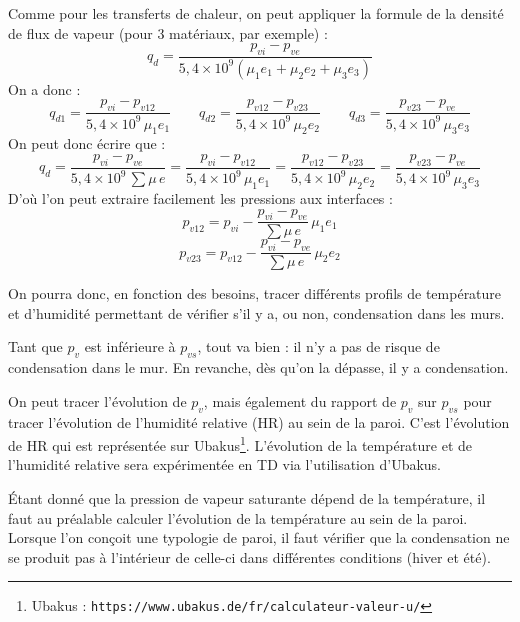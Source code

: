 Comme pour les transferts de chaleur, on peut appliquer la formule de la densité de flux de vapeur (pour 3 matériaux, par exemple) :
\begin{equation}
  q_d = \frac{p_{vi} - p_{ve}}{5{,}4\times10^{9}\left(\mu_1 e_1 + \mu_2 e_2 + \mu_3 e_3\right)}
\end{equation}
On a donc :
\begin{equation}
  q_{d1} = \frac{p_{vi} - p_{v12}}{5{,}4\times10^{9}\,\mu_1 e_1} \qquad
  q_{d2} = \frac{p_{v12} - p_{v23}}{5{,}4\times10^{9}\,\mu_2 e_2} \qquad
  q_{d3} = \frac{p_{v23} - p_{ve}}{5{,}4\times10^{9}\,\mu_3 e_3}
\end{equation}
On peut donc écrire que :
\begin{equation}
  q_d = \frac{p_{vi} - p_{ve}}{5{,}4\times10^{9}\,\sum \mu\,e}
      = \frac{p_{vi} - p_{v12}}{5{,}4\times10^{9}\,\mu_1 e_1}
      = \frac{p_{v12} - p_{v23}}{5{,}4\times10^{9}\,\mu_2 e_2}
      = \frac{p_{v23} - p_{ve}}{5{,}4\times10^{9}\,\mu_3 e_3}
\end{equation}
D'où l'on peut extraire facilement les pressions aux interfaces :
\begin{equation}
  p_{v12} = p_{vi} - \frac{p_{vi} - p_{ve}}{\sum \mu\,e}\,\mu_1 e_1
\end{equation}
\begin{equation}
  p_{v23} = p_{v12} - \frac{p_{vi} - p_{ve}}{\sum \mu\,e}\,\mu_2 e_2
\end{equation}

On pourra donc, en fonction des besoins, tracer différents profils de température et d'humidité permettant de vérifier s'il y a, ou non, condensation dans les murs.

Tant que $p_v$ est inférieure à $p_{vs}$, tout va bien : il n'y a pas de risque de condensation dans le mur. En revanche, dès qu'on la dépasse, il y a condensation.

On peut tracer l'évolution de $p_v$, mais également du rapport de $p_v$ sur $p_{vs}$ pour tracer l'évolution de l'humidité relative (HR) au sein de la paroi.
C'est l'évolution de HR qui est représentée sur Ubakus\footnote{Ubakus : \texttt{https://www.ubakus.de/fr/calculateur-valeur-u/}}. L’évolution de la température et de l'humidité relative sera expérimentée en TD via l'utilisation d'Ubakus.

Étant donné que la pression de vapeur saturante dépend de la température, il faut au préalable calculer l'évolution de la température au sein de la paroi. Lorsque l'on conçoit une typologie de paroi, il faut vérifier que la condensation ne se produit pas à l'intérieur de celle-ci dans différentes conditions (hiver et été).

